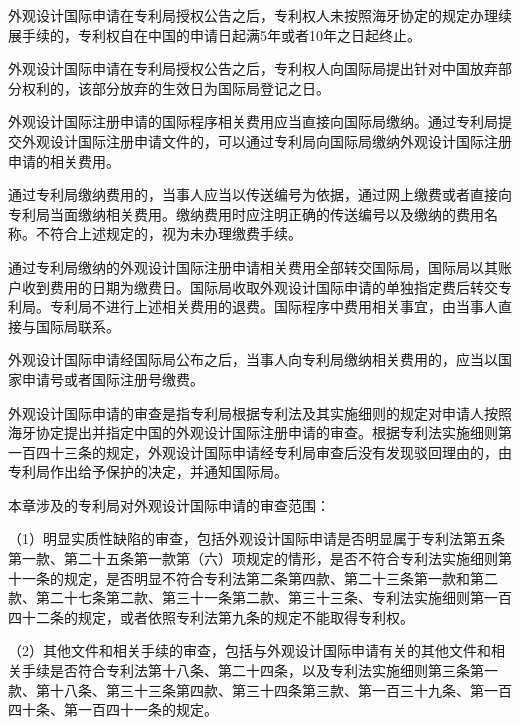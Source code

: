 外观设计国际申请在专利局授权公告之后，专利权人未按照海牙协定的规定办理续展手续的，专利权自在中国的申请日起满5年或者10年之日起终止。

外观设计国际申请在专利局授权公告之后，专利权人向国际局提出针对中国放弃部分权利的，该部分放弃的生效日为国际局登记之日。

外观设计国际注册申请的国际程序相关费用应当直接向国际局缴纳。通过专利局提交外观设计国际注册申请文件的，可以通过专利局向国际局缴纳外观设计国际注册申请的相关费用。

通过专利局缴纳费用的，当事人应当以传送编号为依据，通过网上缴费或者直接向专利局当面缴纳相关费用。缴纳费用时应注明正确的传送编号以及缴纳的费用名称。不符合上述规定的，视为未办理缴费手续。

通过专利局缴纳的外观设计国际注册申请相关费用全部转交国际局，国际局以其账户收到费用的日期为缴费日。国际局收取外观设计国际申请的单独指定费后转交专利局。专利局不进行上述相关费用的退费。国际程序中费用相关事宜，由当事人直接与国际局联系。

外观设计国际申请经国际局公布之后，当事人向专利局缴纳相关费用的，应当以国家申请号或者国际注册号缴费。

外观设计国际申请的审查是指专利局根据专利法及其实施细则的规定对申请人按照海牙协定提出并指定中国的外观设计国际注册申请的审查。根据专利法实施细则第一百四十三条的规定，外观设计国际申请经专利局审查后没有发现驳回理由的，由专利局作出给予保护的决定，并通知国际局。

本章涉及的专利局对外观设计国际申请的审查范围：

{\setlength{\parindent}{17.1bp}（1）明显实质性缺陷的审查，包括外观设计国际申请是否明显属于专利法第五条第一款、第二十五条第一款第（六）项规定的情形，是否不符合专利法实施细则第十一条的规定，是否明显不符合专利法第二条第四款、第二十三条第一款和第二款、第二十七条第二款、第三十一条第二款、第三十三条、专利法实施细则第一百四十二条的规定，或者依照专利法第九条的规定不能取得专利权。\par}

{\setlength{\parindent}{17.1bp}（2）其他文件和相关手续的审查，包括与外观设计国际申请有关的其他文件和相关手续是否符合专利法第十八条、第二十四条，以及专利法实施细则第三条第一款、第十八条、第三十三条第四款、第三十四条第三款、第一百三十九条、第一百四十条、第一百四十一条的规定。\par}

